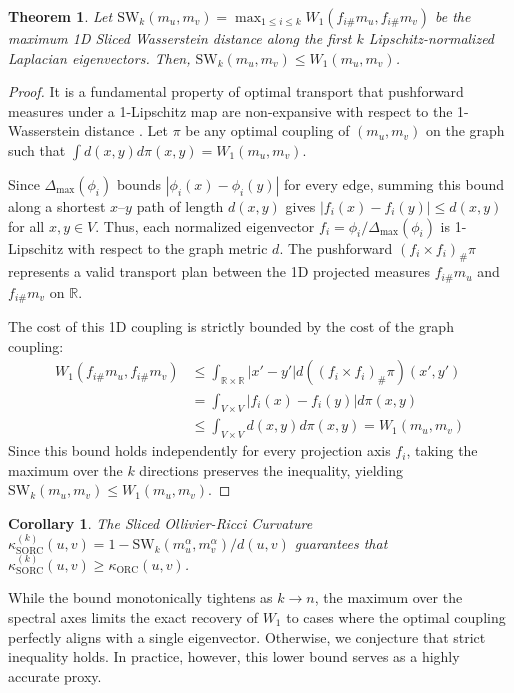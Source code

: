\documentclass{article}
\newtheorem{theorem}{Theorem}
\newtheorem{corollary}{Corollary}
\begin{document}
\begin{theorem}
Let $\text{SW}_k(m_u, m_v) = \max_{1 \le i \le k} W_1(f_{i\#}m_u, f_{i\#}m_v)$ be the maximum 1D Sliced Wasserstein distance along the first $k$ Lipschitz-normalized Laplacian eigenvectors. Then, $\text{SW}_k(m_u, m_v) \le W_1(m_u, m_v)$.
\end{theorem}
\begin{proof}
It is a fundamental property of optimal transport that pushforward measures under a 1-Lipschitz map are non-expansive with respect to the 1-Wasserstein distance \cite{villani2009optimal}. Let $\pi$ be any optimal coupling of $(m_u, m_v)$ on the graph such that $\int d(x,y) d\pi(x,y) = W_1(m_u, m_v)$.

Since $\Delta_{\max}(\phi_i)$ bounds $|\phi_i(x) - \phi_i(y)|$ for every edge, summing this bound along a shortest $x$--$y$ path of length $d(x,y)$ gives $|f_i(x) - f_i(y)| \le d(x,y)$ for all $x, y \in V$. Thus, each normalized eigenvector $f_i = \phi_i / \Delta_{\max}(\phi_i)$ is 1-Lipschitz with respect to the graph metric $d$. The pushforward $(f_i \times f_i)_\# \pi$ represents a valid transport plan between the 1D projected measures $f_{i\#}m_u$ and $f_{i\#}m_v$ on $\mathbb{R}$. 

The cost of this 1D coupling is strictly bounded by the cost of the graph coupling:
\begin{align*}
W_1(f_{i\#}m_u, f_{i\#}m_v) &\le \int_{\mathbb{R} \times \mathbb{R}} |x' - y'| d((f_i \times f_i)_\# \pi)(x',y') \\
&= \int_{V \times V} |f_i(x) - f_i(y)| d\pi(x,y) \\
&\le \int_{V \times V} d(x,y) d\pi(x,y) = W_1(m_u, m_v)
\end{align*}
Since this bound holds independently for every projection axis $f_i$, taking the maximum over the $k$ directions preserves the inequality, yielding $\text{SW}_k(m_u, m_v) \le W_1(m_u, m_v)$.
\end{proof}

\begin{corollary}
The Sliced Ollivier-Ricci Curvature $\kappa_{\text{SORC}}^{(k)}(u,v) = 1 - \text{SW}_k(m_u^\alpha, m_v^\alpha)/d(u,v)$ guarantees that $\kappa_{\text{SORC}}^{(k)}(u,v) \ge \kappa_{\text{ORC}}(u,v)$.
\end{corollary}

While the bound monotonically tightens as $k \to n$, the maximum over the spectral axes limits the exact recovery of $W_1$ to cases where the optimal coupling perfectly aligns with a single eigenvector. Otherwise, we conjecture that strict inequality holds. In practice, however, this lower bound serves as a highly accurate proxy.
\end{document}
